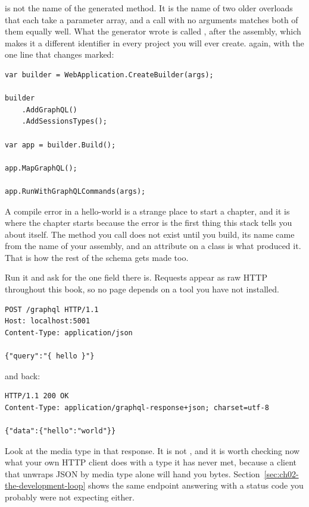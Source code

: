  is not the name of the generated method. It is the name of two
older overloads that each take a parameter array, and a call with no arguments
matches both of them equally well. What the generator wrote is called
, after the assembly, which makes it a different
identifier in every project you will ever create.  again, with
the one line that changes marked:

\begin{verbatim}
var builder = WebApplication.CreateBuilder(args);

builder
    .AddGraphQL()
    .AddSessionsTypes();

var app = builder.Build();

app.MapGraphQL();

app.RunWithGraphQLCommands(args);
\end{verbatim}

A compile error in a hello-world is a strange place to start a chapter, and it
is where the chapter starts because the error is the first thing this stack
tells you about itself. The method you call does not exist until you build, its
name came from the name of your assembly, and an attribute on a class is what
produced it. That is how the rest of the schema gets made too.

Run it and ask for the one field there is. Requests appear as raw HTTP
throughout this book, so no page depends on a tool you have not installed.

\begin{verbatim}
POST /graphql HTTP/1.1
Host: localhost:5001
Content-Type: application/json

{"query":"{ hello }"}
\end{verbatim}

and back:

\begin{verbatim}
HTTP/1.1 200 OK
Content-Type: application/graphql-response+json; charset=utf-8

{"data":{"hello":"world"}}
\end{verbatim}

%
Look at the media type in that response. It is not
, and it is worth checking now what your own HTTP
client does with a type it has never met, because a client that unwraps
JSON by media type alone will hand you bytes.
Section~\ref{sec:ch02-the-development-loop} shows the same endpoint answering
with a status code you probably were not expecting either.

